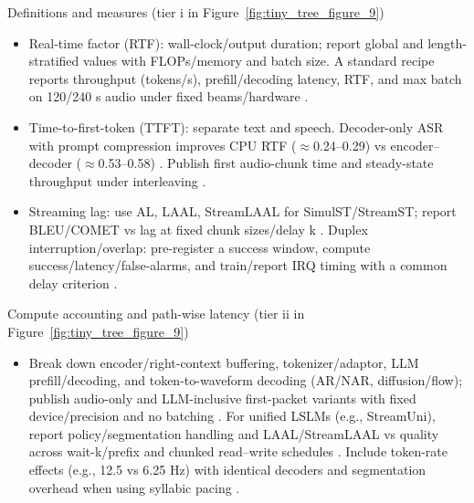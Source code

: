 \documentclass{article}
\begin{document}
Definitions and measures (tier i in Figure~\ref{fig:tiny_tree_figure_9})
\begin{itemize}
  \item Real-time factor (RTF): wall-clock/output duration; report global and length-stratified values with FLOPs/memory and batch size. A standard recipe reports throughput (tokens/s), prefill/decoding latency, RTF, and max batch on 120/240 s audio under fixed beams/hardware \cite{lu2024fastadaspmultitaskadaptedefficientinfere}.
  \item Time-to-first-token (TTFT): separate text and speech. Decoder-only ASR with prompt compression improves CPU RTF ($\approx$0.24--0.29) vs encoder--decoder ($\approx$0.53--0.58) \cite{tsunoo2024decoderonlyarchitecturespeechrecognition}. Publish first audio-chunk time and steady-state throughput under interleaving \cite{lu2024fastadaspmultitaskadaptedefficientinfere}.
  \item Streaming lag: use AL, LAAL, StreamLAAL for SimulST/StreamST; report BLEU/COMET vs lag at fixed chunk sizes/delay k \cite{guo2025streamuniachievingstreamingspeechtransla}. Duplex interruption/overlap: pre-register a success window, compute success/latency/false-alarms, and train/report IRQ timing with a common delay criterion \cite{ma2024languagemodelcanlistenwhilespeaking}.
\end{itemize}

Compute accounting and path-wise latency (tier ii in Figure~\ref{fig:tiny_tree_figure_9})
\begin{itemize}
  \item Break down encoder/right-context buffering, tokenizer/adaptor, LLM prefill/decoding, and token-to-waveform decoding (AR/NAR, diffusion/flow); publish audio-only and LLM-inclusive first-packet variants with fixed device/precision and no batching \cite{entry2025indicsuperbspeechprocessinguniversalperf,vashishth2024stabspeechtokenizerassessmentbenchmark}. For unified LSLMs (e.g., StreamUni), report policy/segmentation handling and LAAL/StreamLAAL vs quality across wait-k/prefix and chunked read--write schedules \cite{guo2025streamuniachievingstreamingspeechtransla}. Include token-rate effects (e.g., 12.5 vs 6.25 Hz) with identical decoders and segmentation overhead when using syllabic pacing \cite{baade2024syllablelmlearningcoarsesemanticunitsspe}.
\end{itemize}
\end{document}

